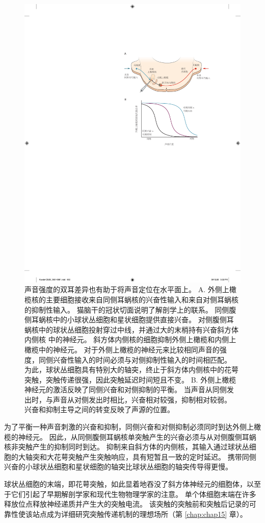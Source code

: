 \begin{figure}[htbp]
	\centering
	\includegraphics[width=0.6\linewidth]{chap28/fig_28_6}
	\caption{声音强度的双耳差异也有助于将声音定位在水平面上。
		A. 外侧上橄榄核的主要细胞接收来自同侧耳蜗核的兴奋性输入和来自对侧耳蜗核的抑制性输入。
		猫脑干的冠状切面说明了解剖学上的联系。
		同侧腹侧耳蜗核中的小球状丛细胞和星状细胞提供直接兴奋。 
		对侧腹侧耳蜗核中的球状丛细胞投射穿过中线，并通过大的末梢持有兴奋斜方体内侧核 中的神经元。
		斜方体内侧核的细胞抑制外侧上橄榄和内侧上橄榄中的神经元。
		对于外侧上橄榄的神经元来比较相同声音的强度，同侧兴奋性输入的时间必须与对侧抑制性输入的时间相匹配。
		为此，球状丛细胞具有特别大的轴突，终止于斜方体内侧核中的花萼突触，突触传递很强，因此突触延迟时间短且不变。
		B. 外侧上橄榄神经元的激活反映了同侧兴奋和对侧抑制的平衡。
		当声音从同侧发出时，与声音从对侧发出时相比，兴奋相对较强，抑制相对较弱。
		兴奋和抑制主导之间的转变反映了声源的位置。}
	\label{fig:28_6}
\end{figure}


为了平衡一种声音刺激的兴奋和抑制，同侧兴奋和对侧抑制必须同时到达外侧上橄榄的神经元。
因此，从同侧腹侧耳蜗核单突触产生的兴奋必须与从对侧腹侧耳蜗核非突触产生的抑制同时到达。
抑制来自斜方体的内侧核，其输入通过球状丛细胞的大轴突和大花萼突触产生突触响应，具有短暂且一致的定时延迟。
携带同侧兴奋的小球状丛细胞和星状细胞的轴突比球状丛细胞的轴突传导得更慢。


球状丛细胞的末端，即花萼突触，如此显着地吞没了斜方体神经元的细胞体，以至于它们引起了早期解剖学家和现代生物物理学家的注意。
单个体细胞末端在许多释放位点释放神经递质并产生大的突触电流。
该突触的突触前和突触后记录的可靠性使该站点成为详细研究突触传递机制的理想场所（第 \ref{chap:chap15} 章）。



